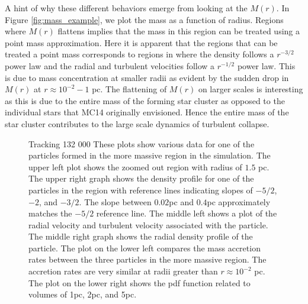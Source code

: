 \documentclass{emulateapj}
\begin{document}

A hint of why these different behaviors emerge from looking at the $M(r)$.  In Figure \ref{fig:mass_example}, we plot the mass as a function of radius.  Regions where $M(r)$ flattens implies that the mass in this region can be treated using a point mass approximation.  Here it is apparent that the regions that can be treated a point mass corresponds to regions in where the density follows a $r^{-3/2}$ power law and the radial and turbulent velocities follow a $r^{-1/2}$ power law.  This is due to mass concentration at smaller radii as evident by the sudden drop in $M(r)$ at $r \approx 10^{-2} - 1$ pc.  The flattening of $M(r)$ on larger scales is interesting as this is due to the entire mass of the forming star cluster as opposed to the individual stars that MC14 originally envisioned.  Hence the entire mass of the star cluster contributes to the large scale dynamics of turbulent collapse.    


\begin{figure}
\caption{Tracking 132 000  These plots show various data for one of the particles formed in the more massive region in the simulation.  The upper left plot shows the zoomed out region with radius of $1.5$ pc. The upper right graph shows the density profile for one of the particles in the region with reference lines indicating slopes of $-5/2$, $-2$, and $-3/2$.  The slope between $0.02$pc and $0.4$pc approximately matches the $-5/2$ reference line.  The middle left shows a plot of the radial velocity and turbulent velocity associated with the particle.    The middle right graph shows the radial density profile of the particle.  The plot on the lower left compares the mass accretion rates between the three particles in the more massive region.  The accretion rates are very similar at radii greater than $r \approx 10^{-2}$ pc.  The plot on the lower right shows the pdf function related to volumes of 1pc, 2pc, and 5pc.    \label{fig:132 000 graphs}}
\end{figure}
\end{document}
